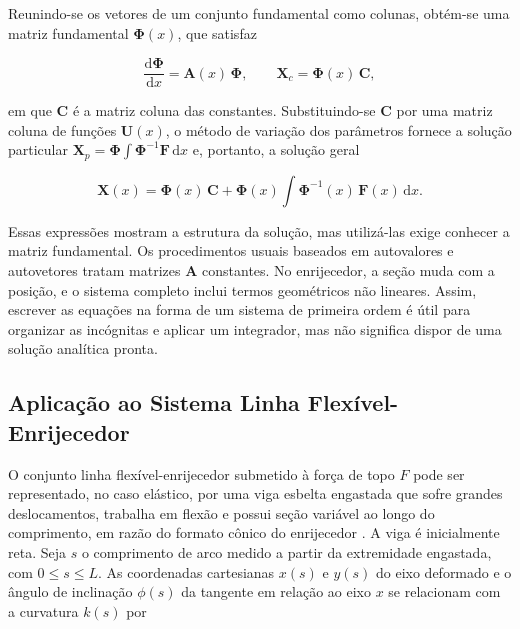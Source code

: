 \documentclass[arial,centeredequations,english,brazilian,oneside,section=TITLE]{ifes8}
\begin{document}
Reunindo-se os vetores de um conjunto fundamental como colunas, obtém-se uma matriz
fundamental $\boldsymbol{\Phi}(x)$, que satisfaz

\begin{equation}
  \label{eq:matriz-fundamental}
  \frac{\mathrm{d}\boldsymbol{\Phi}}{\mathrm{d}x} = \mathbf{A}(x)\,\boldsymbol{\Phi},
  \qquad \mathbf{X}_c = \boldsymbol{\Phi}(x)\,\mathbf{C},
\end{equation}

em que $\mathbf{C}$ é a matriz coluna das constantes. Substituindo-se $\mathbf{C}$ por
uma matriz coluna de funções $\mathbf{U}(x)$, o método de variação dos parâmetros fornece
a solução particular $\mathbf{X}_p = \boldsymbol{\Phi}\int \boldsymbol{\Phi}^{-1}
\mathbf{F}\,\mathrm{d}x$ e, portanto, a solução geral

\begin{equation}
  \label{eq:var-parametros}
  \mathbf{X}(x) = \boldsymbol{\Phi}(x)\,\mathbf{C}
  + \boldsymbol{\Phi}(x) \int \boldsymbol{\Phi}^{-1}(x)\,\mathbf{F}(x)\,\mathrm{d}x.
\end{equation}

Essas expressões mostram a estrutura da solução, mas utilizá-las exige conhecer
a matriz fundamental. Os procedimentos usuais baseados em autovalores e autovetores
tratam matrizes $\mathbf A$ constantes. No enrijecedor, a seção muda com a posição,
e o sistema completo inclui termos geométricos não lineares. Assim, escrever as
equações na forma de um sistema de primeira ordem é útil para organizar as
incógnitas e aplicar um integrador, mas não significa dispor de uma solução
analítica pronta.
 
\subsection{Aplicação ao Sistema Linha Flexível-Enrijecedor}
\label{sub:edo-enrijecedor}
 
O conjunto linha flexível-enrijecedor submetido à força de topo $F$ pode ser
representado, no caso elástico, por
uma viga esbelta engastada que sofre grandes deslocamentos, trabalha em flexão e possui
seção variável ao longo do comprimento, em razão do formato cônico do enrijecedor
\cite{Caire2005,Souza2008}.
A viga é inicialmente reta. Seja $s$ o comprimento de arco medido a partir da extremidade
engastada, com $0 \le s \le L$. As coordenadas cartesianas $x(s)$ e $y(s)$ do eixo
deformado e o ângulo de inclinação $\phi(s)$ da tangente em relação ao eixo $x$ se
relacionam com a curvatura $k(s)$ por
\end{document}
